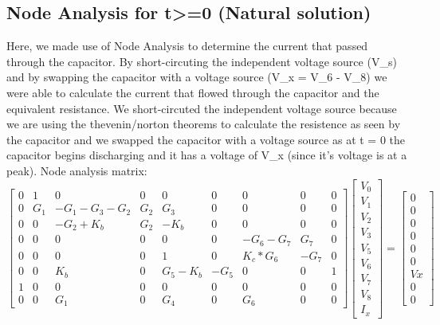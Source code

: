 \subsection{Node Analysis for t>=0 (Natural solution)}
\label{subsec:node}
\tab Here, we made use of Node Analysis to determine the current that passed through the capacitor. By short-circuting the independent voltage source (V_s) and by swapping the capacitor with a voltage source (V_x = V_6 - V_8) we were able to calculate the current that flowed through the capacitor and the equivalent resistance. We short-circuted the independent voltage source because we are using the thevenin/norton theorems to calculate the resistence as seen by the capacitor and we swapped the capacitor with a voltage source as at t = 0 the capacitor begins discharging and it has a voltage of V_x (since it's voltage is at a peak). 
Node analysis matrix:
\begin{equation}
\begin{bmatrix}
  0 & 1 & 0 & 0 & 0 & 0 & 0 & 0 & 0 \\
  0 & G_1 & -G_1-G_3-G_2 & G_2 & G_3 & 0 & 0 & 0 & 0 \\
  0 & 0 & -G_2+K_b & G_2 & -K_b & 0 & 0 & 0 & 0 \\
  0 & 0 & 0 & 0 & 0 & 0 & -G_6-G_7 & G_7 & 0 \\
  0 & 0 & 0 & 0 & 1 & 0 & K_c*G_6 & -G_7 & 0 \\
  0 & 0 & K_b & 0 & G_5-K_b & -G_5 & 0 & 0 & 1 \\
  1 & 0 & 0 & 0 & 0 & 0 & 0 & 0 & 0 \\
  0 & 0 & G_1 & 0 & G_4 & 0 & G_6 & 0 & 0
\end{bmatrix}
\begin{bmatrix}
  V_0 \\ V_1 \\ V_2 \\ V_3 \\ V_5 \\ V_6 \\ V_7 \\ V_8 \\ I_x
\end{bmatrix}
=
\begin{bmatrix}
  0 \\ 0 \\ 0 \\ 0 \\ 0 \\ 0 \\ Vx \\ 0 \\ 0
\end{bmatrix}
\end{equation}



